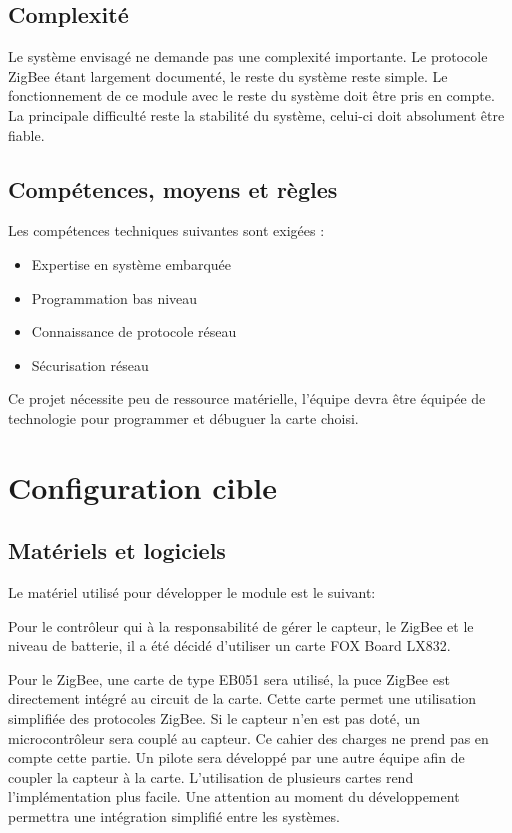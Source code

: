 \subsection{Complexité}

Le système envisagé ne demande pas une complexité importante. Le protocole ZigBee étant largement documenté, le reste du système reste simple. Le fonctionnement de ce module avec le reste du système doit être pris en compte. 
La principale difficulté reste la stabilité du système, celui-ci doit absolument être fiable. 

\subsection{Compétences, moyens et règles}

Les compétences techniques suivantes sont exigées :
\begin{itemize}
\item Expertise en système embarquée
\item Programmation bas niveau
\item Connaissance de protocole réseau
\item Sécurisation réseau
\end{itemize}
Ce projet nécessite peu de ressource matérielle, l'équipe devra être équipée de technologie pour programmer et débuguer la carte choisi. 

\section{Configuration cible}

\subsection{Matériels et logiciels}

Le matériel utilisé pour développer le module est le suivant:

Pour le contrôleur qui à la responsabilité de gérer le capteur, le ZigBee et le niveau de batterie, il a été décidé d'utiliser un carte FOX Board LX832.

Pour le ZigBee, une carte de type EB051 sera utilisé, la puce ZigBee est directement intégré au circuit de la carte. Cette carte permet une utilisation simplifiée des protocoles ZigBee.
Si le capteur n'en est pas doté, un microcontrôleur sera couplé au capteur. Ce cahier des charges ne prend pas en compte cette partie. Un pilote sera développé par une autre équipe afin de coupler la capteur à la carte.
L'utilisation de plusieurs cartes rend l'implémentation plus facile. Une attention au moment du développement permettra une intégration simplifié entre les systèmes.


